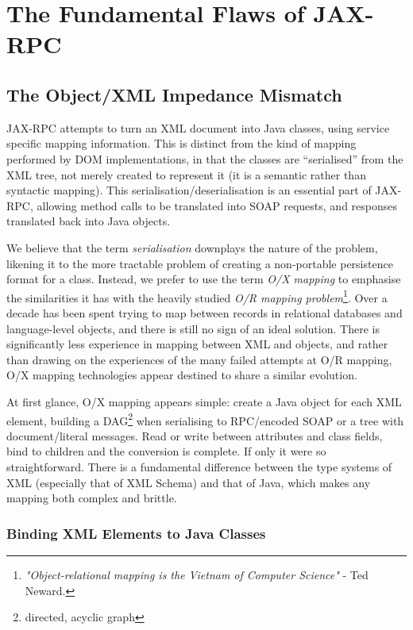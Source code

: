 \section{The Fundamental Flaws of JAX-RPC}
\label{objections}

\subsection{The Object/XML Impedance Mismatch}
\label{objections:o-x}

JAX-RPC attempts to turn an XML document into Java classes, using service
specific mapping information. This is distinct from the kind of
mapping performed by DOM implementations, in that the classes are
``serialised'' from the XML tree, not merely created to represent it
(it is a semantic rather than syntactic mapping). This
serialisation/deserialisation is an essential part of JAX-RPC,
allowing method calls to be translated into SOAP requests, and
responses translated back into Java objects.

We believe that the term \emph{serialisation} downplays the nature of
the problem, likening it to the more tractable problem of creating a
non-portable persistence format for a class. Instead, we prefer to use
the term \emph{O/X mapping} to emphasise the similarities it has with
the heavily studied \emph{O/R mapping problem}\footnote{
\emph{"Object-relational mapping is the Vietnam of Computer Science"}
- Ted Neward.
}. 
Over a decade has been spent trying to map between records in relational
databases and language-level objects, and there is still no sign of an ideal
solution. There is significantly less experience in mapping between XML and
objects, and rather than drawing on the experiences of the many failed attempts
at O/R mapping, O/X mapping technologies appear destined to share a similar
evolution.

At first glance, O/X mapping appears simple: create a Java object for
each XML element, building a DAG\footnote{directed, acyclic graph}
when serialising to RPC/encoded SOAP or a tree with document/literal
messages. Read or write between attributes and class fields, bind to
children and the conversion is complete. If only it were so
straightforward. There is a fundamental difference between the type
systems of XML (especially that of XML Schema) and that of Java, which
makes any mapping both complex and brittle.


\subsubsection{Binding XML Elements to Java Classes}
\label{objections:o-x:xml-classes}

